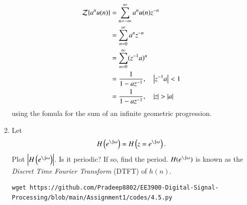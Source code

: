 \documentclass[journal,12pt,twocolumn]{IEEEtran}
\renewcommand\thesection{\arabic{section}}
\begin{document}
\begin{enumerate}[label=\thesection.\arabic*]
\begin{equation}
\end{equation}
\solution
\begin{align}
	{\mathcal {Z}}\{a^nu(n)\}&=\sum _{n=-\infty }^{\infty }a^nu(n)z^{-n}\\
	&=\sum _{n=0 }^{\infty }a^nz^{-n}\\
	&=\sum _{n=0 }^{\infty }(z^{-1}a)^{n}\\
	&=\frac{1}{1-az^{-1}}, \quad \left\vert z^{-1}a\right\vert < 1\\
	&=\frac{1}{1-az^{-1}}, \quad \left\vert z\right\vert > \left\vert a\right\vert 
\end{align}
using the fomula for the sum of an infinite geometric progression.
%
\item 
Let
\begin{equation}
H\brak{e^{\j \omega}} = H\brak{z = e^{\j \omega}}.
\end{equation}
Plot $\abs{H\brak{e^{\j \omega}}}$.  Is it periodic? If so, find the period.  $H(e^{\j \omega})$ is
known as the {\em Discret Time Fourier Transform} (DTFT) of $h(n)$.
\\
\solution 
\begin{lstlisting}
wget https://github.com/Pradeep8802/EE3900-Digital-Signal-Processing/blob/main/Assignment1/codes/4.5.py
\end{lstlisting}


\end{enumerate}
\end{document}
